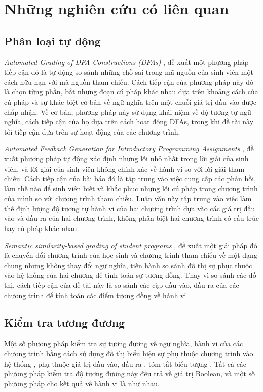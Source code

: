 \section{Những nghiên cứu có liên quan}

	\subsection{Phân loại tự động}
	
	\textit{Automated Grading of DFA Constructions (DFAs)} \cite{alur2013automated}, đề xuất một phương pháp tiếp cận đó là tự động so sánh những chỗ sai trong mã nguồn của sinh viên một cách hữu hạn với mã nguồn tham chiếu. Cách tiếp cận của phương pháp này đó là chọn từng phần, bắt những đoạn cú pháp khác nhau dựa trên khoảng cách của cú pháp và sự khác biệt cơ bản về ngữ nghĩa trên một chuỗi giá trị đầu vào được chấp nhận. Về cơ bản, phương pháp này sử dụng khái niệm về độ tương tự ngữ nghĩa, cách tiếp cận của họ dựa trên cách hoạt động DFAs, trong khi đề tài này tôi tiếp cận dựa trên sự hoạt động của các chương trình.
	
	\textit{Automated Feedback Generation for Introductory Programming Assignments} \cite{singh2013automated}, đề xuất phương pháp tự động xác định những lỗi nhỏ nhất trong lời giải của sinh viên, và lời giải của sinh viên không chính xác về hành vi so với lời giải tham chiếu. Cách tiếp cận của bài báo đó là tập trung vào việc cung cấp các phản hồi, làm thế nào để sinh viên biết và khắc phục những lỗi cú pháp trong chương trình của mình so với chương trình tham chiếu. Luận văn này tập trung vào việc làm thế định lượng độ tương tự hành vi của hai chương trình dựa vào các giá trị đầu vào và đầu ra của hai chương trình, không phân biệt hai chương trình có cấu trúc hay cú pháp khác nhau.

	\textit{Semantic similarity-based grading of student programs} \cite{wang2007semantic}, đề xuất một giải pháp đó là chuyển đổi chương trình của học sinh và chương trình tham chiếu về một dạng chung nhưng không thay đổi ngữ nghĩa, tiến hành so sánh đồ thị sự phục thuộc vào hệ thống của hai chương để tính toán sự tương đồng. Thay vì so sánh các đồ thị, cách tiếp cận của đề tài này là so sánh các cặp đầu vào, đầu ra của các chương trình để tính toán các điểm tương đồng về hành vi. 
	
	\subsection{Kiểm tra tương đương}
	Một số phương pháp kiểm tra sự tương đương về ngữ nghĩa, hành vi của các chương trình bằng cách sử dụng đồ thị biểu hiện sự phụ thuộc chương trình vào hệ thống \cite{bates1993incremental} \cite{binkley1992using}, phụ thuộc giá trị đầu vào, đầu ra \cite{jackson1994semantic}, tóm tắt biểu tượng \cite{person2008differential}. Tất cả các phương pháp kiểm tra độ tương đương này đều trả về giá trị Boolean, và một số phương pháp cho kết quả về hành vi là như nhau. 
	
